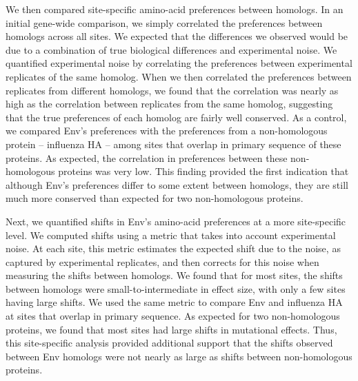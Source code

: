 \documentclass[9pt]{elife}
\begin{document}
We then compared site-specific amino-acid preferences between homologs.
In an initial gene-wide comparison, we simply correlated the preferences between homologs across all sites.
We expected that the differences we observed would be due to a combination of true biological differences and experimental noise.
We quantified experimental noise by correlating the preferences between experimental replicates of the same homolog.
When we then correlated the preferences between replicates from different homologs, we found that the correlation was nearly as high as the correlation between replicates from the same homolog, suggesting that the true preferences of each homolog are fairly well conserved.
As a control, we compared Env's preferences with the preferences from a non-homologous protein -- influenza HA -- among sites that overlap in primary sequence of these proteins.
As expected, the correlation in preferences between these non-homologous proteins was very low.
This finding provided the first indication that although Env's preferences differ to some extent between homologs, they are still much more conserved than expected for two non-homologous proteins.

Next, we quantified shifts in Env's amino-acid preferences at a more site-specific level.
We computed shifts using a metric that takes into account experimental noise.
At each site, this metric estimates the expected shift due to the noise, as captured by experimental replicates, and then corrects for this noise when measuring the shifts between homologs.
We found that for most sites, the shifts between homologs were small-to-intermediate in effect size, with only a few sites having large shifts.
We used the same metric to compare Env and influenza HA at sites that overlap in primary sequence.
As expected for two non-homologous proteins, we found that most sites had large shifts in mutational effects.
Thus, this site-specific analysis provided additional support that the shifts observed between Env homologs were not nearly as large as shifts between non-homologous proteins.
\end{document}
